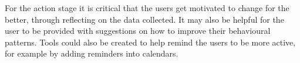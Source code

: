 For the action stage it is critical that the users get motivated to change for the better, through reflecting on the data collected. It may also be helpful for the user to be provided with suggestions on how to improve their behavioural patterns. Tools could also be created to help remind the users to be more active, for example by adding reminders into calendars.


